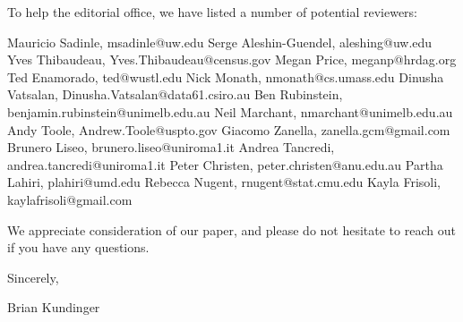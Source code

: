 \documentclass[11pt]{letter}
\begin{document}
\begin{letter}
To help the editorial office, we have listed a number of potential reviewers:

\setlength{\parindent}{0mm}
\hangindent=10mm
Mauricio Sadinle, msadinle@uw.edu \newline
Serge Aleshin-Guendel, aleshing@uw.edu \newline
Yves Thibaudeau, Yves.Thibaudeau@census.gov \newline
Megan Price, meganp@hrdag.org \newline
Ted Enamorado, ted@wustl.edu \newline
Nick Monath, nmonath@cs.umass.edu \newline
Dinusha Vatsalan, Dinusha.Vatsalan@data61.csiro.au \newline
Ben Rubinstein, benjamin.rubinstein@unimelb.edu.au \newline
Neil Marchant, nmarchant@unimelb.edu.au \newline
Andy Toole, Andrew.Toole@uspto.gov \newline
Giacomo Zanella, zanella.gcm@gmail.com \newline
Brunero Liseo, brunero.liseo@uniroma1.it \newline
Andrea Tancredi, andrea.tancredi@uniroma1.it \newline
Peter Christen, peter.christen@anu.edu.au \newline
Partha Lahiri, plahiri@umd.edu \newline
Rebecca Nugent, rnugent@stat.cmu.edu \newline
Kayla Frisoli, kaylafrisoli@gmail.com \newline

We appreciate consideration of our paper, and please do not hesitate to reach out if you have any questions. 



 \closing{Sincerely,}
 Brian Kundinger
 
 


\end{letter}
\end{document}
